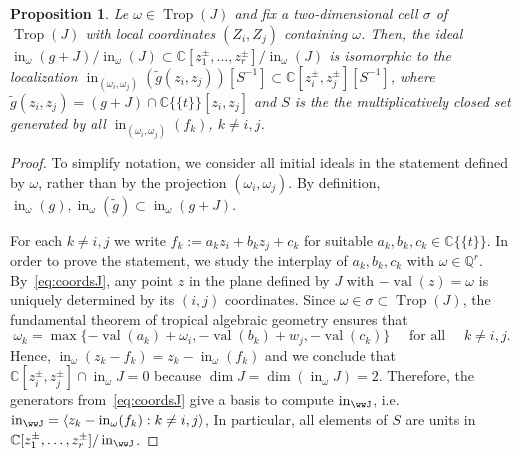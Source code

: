 \documentclass[11pt]{amsart}
\numberwithin{equation}{section}
\theoremstyle{plain}
\newtheorem{proposition}[theorem]{Proposition}
\theoremstyle{definition}
\theoremstyle{remark}
\begin{document}
\begin{proposition}\label{pr:projectionsJ}
  Le ${\omega}\in \operatorname{Trop}(J)$ and fix a two-dimensional cell $\sigma$ of
  $\operatorname{Trop}(J)$ with local coordinates $(Z_i,Z_j)$ containing ${\omega}$.
  Then, the ideal $\operatorname{in}_{\omega}(g+J)/\operatorname{in}_{\omega}(J)\subset {\mathbb{C}}[z_1^{\pm}, \ldots,
  z_r^{\pm}]/\operatorname{in}_{\omega}(J)$ is isomorphic to the localization
  $\operatorname{in}_{({\omega}_i,{\omega}_j)}(\tilde{g}(z_i,z_j)) [S^{-1}]\subset
  {\mathbb{C}}[z_i^{\pm}, z_j^{\pm}][S^{-1}]$, where $\tilde{g}(z_i,z_j)=( g +
  J) \cap {{\mathbb{C}}\{\!\{t
\}\!\}}[z_i,z_j]$ and $S$ is the the multiplicatively closed set
  generated by all $\operatorname{in}_{({\omega}_i,{\omega}_j)}(f_k)$, $k\neq i,j$.
\end{proposition}
\begin{proof} 
  To simplify notation, we consider all initial ideals in the
  statement defined by ${\omega}$, rather than by the projection
  $({\omega}_i,{\omega}_j)$.  By definition, $ \operatorname{in}_{\omega}(g),
  \operatorname{in}_{\omega}(\tilde{g}) \subset \operatorname{in}_{\omega} (g+J)$.

  For each $k\neq i,j$ we write $f_k:= a_kz_i + b_k z_j + c_k$ for
  suitable $a_k,b_k,c_k\in {{\mathbb{C}}\{\!\{t
\}\!\}}$.  In order to prove the statement, we
  study the interplay of $a_k,b_k,c_k$ with ${\omega}\in {\mathbb{Q}}^r$.
  By~\eqref{eq:coordsJ}, any point $z$ in the plane defined by $J$
  with $-\operatorname{val}(z)={\omega}$ is uniquely determined by its $(i,j)$
  coordinates.  Since ${\omega}\in \sigma\subset \operatorname{Trop}(J)$, the fundamental
  theorem of tropical algebraic geometry ensures that
\begin{equation}
{\omega}_k=
\max\{-\operatorname{val}(a_k)+{\omega}_i, -\operatorname{val}(b_k)+w_j, -\operatorname{val}(c_k)\}\quad \text{ for all }\quad k\neq
i,j.\label{eq:initialFormsJ}
\end{equation}
Hence, $\operatorname{in}_{\omega}(z_k-f_k)=z_k -\operatorname{in}_{\omega}(f_k)$ and we conclude
that $ {\mathbb{C}}[z_i^{\pm}, z_j^{\pm}]\cap \operatorname{in}_{\omega} J =0$ because $\dim
J=\dim (\operatorname{in}_{\omega} J)=2$. Therefore, the generators
from~\eqref{eq:coordsJ} give a basis to compute $\operatorname{in}_\wwJ$, i.e.\
$\operatorname{in}_\wwJ=\langle z_k-\operatorname{in}_{\omega}(f_k): k\neq i,j\rangle$, In
particular, all elements of $S$ are units in ${\mathbb{C}}[z_1^{\pm},\ldots,
z_r^{\pm}]/\operatorname{in}_\wwJ$.


\end{proof}
\end{document}
